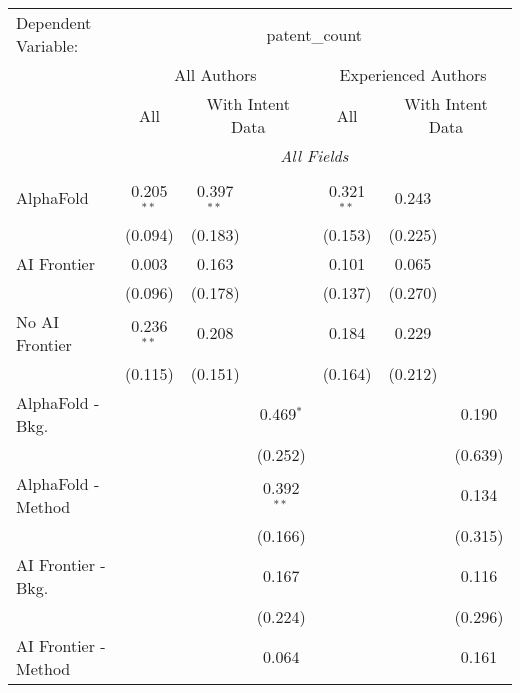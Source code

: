 \begingroup
\centering
\begin{tabular}{lcccccc}
   \tabularnewline \midrule \midrule
   Dependent Variable: & \multicolumn{6}{c}{patent\_count}\\
 & \multicolumn{3}{c}{All Authors} & \multicolumn{3}{c}{Experienced Authors} \\
\cmidrule(lr){2-4} \cmidrule(lr){5-7}
 & \multicolumn{1}{c}{All} & \multicolumn{2}{c}{With Intent Data} & \multicolumn{1}{c}{All} & \multicolumn{2}{c}{With Intent Data} \\
\cmidrule(lr){2-2} \cmidrule(lr){3-4} \cmidrule(lr){5-5} \cmidrule(lr){6-7}
 & \multicolumn{6}{c}{\textit{All Fields}} \\ \\
   AlphaFold               & 0.205$^{**}$ & 0.397$^{**}$ &              & 0.321$^{**}$ & 0.243   &   \\   
                           & (0.094)      & (0.183)      &              & (0.153)      & (0.225) &   \\   
   AI Frontier             & 0.003        & 0.163        &              & 0.101        & 0.065   &   \\   
                           & (0.096)      & (0.178)      &              & (0.137)      & (0.270) &   \\   
   No AI Frontier          & 0.236$^{**}$ & 0.208        &              & 0.184        & 0.229   &   \\   
                           & (0.115)      & (0.151)      &              & (0.164)      & (0.212) &   \\   
   AlphaFold - Bkg.        &              &              & 0.469$^{*}$  &              &         & 0.190\\   
                           &              &              & (0.252)      &              &         & (0.639)\\   
   AlphaFold - Method      &              &              & 0.392$^{**}$ &              &         & 0.134\\   
                           &              &              & (0.166)      &              &         & (0.315)\\   
   AI Frontier - Bkg.      &              &              & 0.167        &              &         & 0.116\\   
                           &              &              & (0.224)      &              &         & (0.296)\\   
   AI Frontier - Method    &              &              & 0.064        &              &         & 0.161\\   

\end{tabular}
